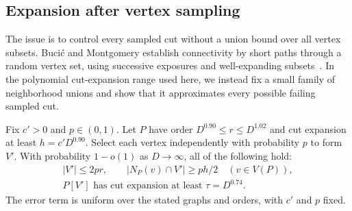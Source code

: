 \subsection{Expansion after vertex sampling}

The issue is to control every sampled cut without a union bound over
all vertex subsets. Buci\'c and Montgomery establish connectivity by
short paths through a random vertex set, using successive exposures
and well-expanding subsets~\cite[Section~4]{BM2024}. In the polynomial cut-expansion
range used here, we instead fix a small family of neighborhood unions
and show that it approximates every possible failing sampled cut.

\begin{lemma}\label{lem:vertex-sampling}
Fix $c'>0$ and $p\in(0,1)$.  Let $P$ have order
$D^{0.90}\le r\le D^{1.02}$ and cut expansion at least
$h=c'D^{0.90}$.  Select each vertex independently with probability $p$
to form $V'$.  With probability $1-o(1)$ as $D\to\infty$, all of the
following hold:
\begin{equation}\label{eq:residue-sampling-properties}
\begin{gathered}
  |V'|\le2pr,\qquad
  |N_P(v)\cap V'|\ge ph/2\quad(v\in V(P)),\\
  P[V']\text{ has cut expansion at least }\tau=D^{0.74}.
\end{gathered}
\end{equation}
The error term is uniform over the stated graphs and orders, with
$c'$ and $p$ fixed.
\end{lemma}

